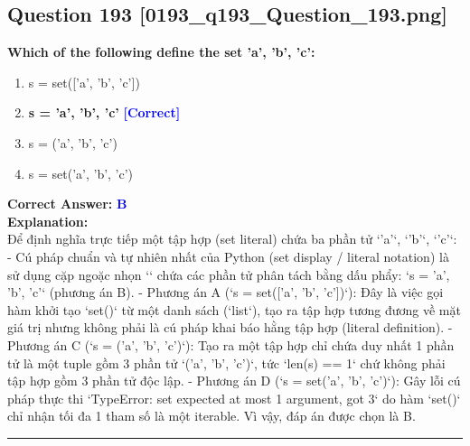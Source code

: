 \documentclass[11pt,a4paper]{article}
\begin{document}
\begin{minipage}{\textwidth}
\subsection*{Question 193 \quad \footnotesize{[0193_q193_Question_193.png]}}
\noindent \textbf{Which of the following define the set 'a', 'b', 'c':}

\begin{enumerate}[label=\Alph*.]
    \item s = set(['a', 'b', 'c'])
    \item \textbf{s = 'a', 'b', 'c'} \hfill \textcolor{blue}{\textbf{[Correct]}}
    \item s = ('a', 'b', 'c')
    \item s = set('a', 'b', 'c')
\end{enumerate}

\noindent \textbf{Correct Answer:} \textcolor{blue}{\textbf{B}} \\[4pt]
\noindent \textbf{Explanation:}\\
Để định nghĩa trực tiếp một tập hợp (set literal) chứa ba phần tử `'a'`, `'b'`, `'c'`:\newline
- Cú pháp chuẩn và tự nhiên nhất của Python (set display / literal notation) là sử dụng cặp ngoặc nhọn `{}` chứa các phần tử phân tách bằng dấu phẩy: `s = {'a', 'b', 'c'}` (phương án B).\newline
- Phương án A (`s = set(['a', 'b', 'c'])`): Đây là việc gọi hàm khởi tạo `set()` từ một danh sách (`list`), tạo ra tập hợp tương đương về mặt giá trị nhưng không phải là cú pháp khai báo hằng tập hợp (literal definition).\newline
- Phương án C (`s = {('a', 'b', 'c')}`): Tạo ra một tập hợp chỉ chứa duy nhất 1 phần tử là một tuple gồm 3 phần tử `('a', 'b', 'c')`, tức `len(s) == 1` chứ không phải tập hợp gồm 3 phần tử độc lập.\newline
- Phương án D (`s = set('a', 'b', 'c')`): Gây lỗi cú pháp thực thi `TypeError: set expected at most 1 argument, got 3` do hàm `set()` chỉ nhận tối đa 1 tham số là một iterable.\newline
Vì vậy, đáp án được chọn là B.
\end{minipage}
\vspace{0.8cm}
\hrule
\vspace{0.5cm}
\end{document}
